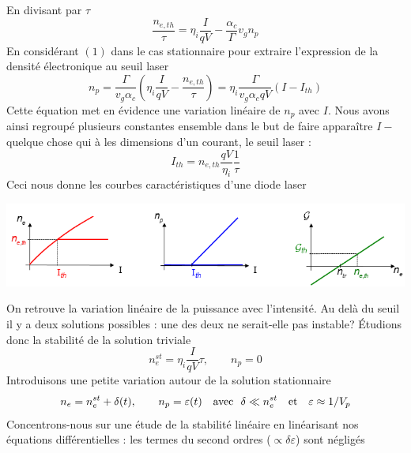 	En divisant par $\tau$
	\begin{equation}
	\frac{{{n_{e,th}}}}{\tau } = {\eta _i}\frac{{I}}{{qV}} - \frac{{{\alpha _c}}}{\Gamma }{v_g}
	{n_p}
	\end{equation}
	En considérant $(1)$ dans le cas stationnaire pour extraire l'expression de la densité 
	électronique au seuil laser 
	\begin{equation}
	{n_p} = \frac{\Gamma }{{{v_g}{\alpha _c}}}({\eta _i}\frac{{I}}{{qV}} - \frac{{{n_{e,th}}}
	}{\tau }) = {\eta _i}\frac{\Gamma }{{{v_g}{\alpha _c}qV}}({I - }{{I}_{th}})
	\end{equation}
	Cette équation met en évidence une variation linéaire de $n_p$ avec $I$. Nous avons ainsi 
	regroupé plusieurs constantes ensemble dans le but de faire apparaître $I-$quelque chose qui
	à les dimensions d'un courant, le seuil laser :
	\begin{equation}
	{{I}_{th}} = {n_{e,th}}\frac{{qV}}{{{\eta _i}}}\frac{1}{\tau }
	\end{equation}
	Ceci nous donne les courbes caractéristiques d'une diode laser
	\begin{center}
	\includegraphics[scale=0.75]{ch5/image49}
	\end{center}
	On retrouve la variation linéaire de la puissance avec l'intensité. Au delà du seuil il y 
	a deux solutions possibles : une des deux ne serait-elle pas instable? Étudions donc la
	stabilité de la solution triviale
	\begin{equation}
	n_e^{st} = {\eta _i}\frac{{I}}{{qV}}\tau,\qquad n_p=0
	\end{equation}
	Introduisons une petite variation autour de la solution stationnaire
	\begin{equation}
	{n_e} = n_e^{st} + \delta (t),\qquad {n_p} = \varepsilon (t)\quad\text{avec }\ 
	\delta  \ll n_e^{st}\ \ \  {\rm{ et  }}\ \ \ \varepsilon \approx1/{V_p}
	\end{equation}
	Concentrons-nous sur une étude de la stabilité linéaire en linéarisant nos équations 
	différentielles : les termes du second ordres ($\propto \delta\varepsilon$) sont négligés
